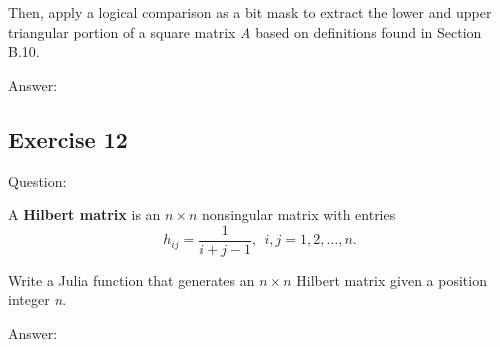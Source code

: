 \documentclass{article}
\begin{document}
Then, apply a logical comparison as a bit mask to extract the lower and upper triangular portion of a square matrix \textit{A} based on definitions found in Section B.10.

Answer:

\subsection{Exercise 12}

Question:

A \textbf{Hilbert matrix} is an $n \times n$ nonsingular matrix with entries
\begin{equation}
h_{ij} = \frac{1}{i+j-1},\ \ i, j = 1, 2, \ldots, n.
\end{equation}

Write a Julia function that generates an $n \times n$ Hilbert matrix given a position integer \textit{n}.

Answer:
\end{document}

